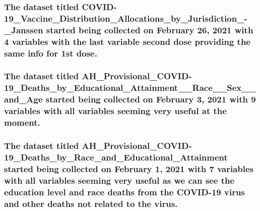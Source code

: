 \documentclass[
]{article}
\begin{document}
\hypertarget{the-dataset-titled-covid-19_vaccine_distribution_allocations_by_jurisdiction_-_janssen-started-being-collected-on-february-26-2021-with-4-variables-with-the-last-variable-second-dose-providing-the-same-info-for-1st-dose.}{%
\subsubsection{The dataset titled
COVID-19\_Vaccine\_Distribution\_Allocations\_by\_Jurisdiction\_-\_Janssen
started being collected on February 26, 2021 with 4 variables with the
last variable second dose providing the same info for 1st
dose.}\label{the-dataset-titled-covid-19_vaccine_distribution_allocations_by_jurisdiction_-_janssen-started-being-collected-on-february-26-2021-with-4-variables-with-the-last-variable-second-dose-providing-the-same-info-for-1st-dose.}}

\hypertarget{the-dataset-titled-ah_provisional_covid-19_deaths_by_educational_attainment__race__sex__and_age-started-being-collected-on-february-3-2021-with-9-variables-with-all-variables-seeming-very-useful-at-the-moment.}{%
\subsubsection{The dataset titled
AH\_Provisional\_COVID-19\_Deaths\_by\_Educational\_Attainment\_\_Race\_\_Sex\_\_and\_Age
started being collected on February 3, 2021 with 9 variables with all
variables seeming very useful at the
moment.}\label{the-dataset-titled-ah_provisional_covid-19_deaths_by_educational_attainment__race__sex__and_age-started-being-collected-on-february-3-2021-with-9-variables-with-all-variables-seeming-very-useful-at-the-moment.}}

\hypertarget{the-dataset-titled-ah_provisional_covid-19_deaths_by_race_and_educational_attainment-started-being-collected-on-february-1-2021-with-7-variables-with-all-variables-seeming-very-useful-as-we-can-see-the-education-level-and-race-deaths-from-the-covid-19-virus-and-other-deaths-not-related-to-the-virus.}{%
\subsubsection{The dataset titled
AH\_Provisional\_COVID-19\_Deaths\_by\_Race\_and\_Educational\_Attainment
started being collected on February 1, 2021 with 7 variables with all
variables seeming very useful as we can see the education level and race
deaths from the COVID-19 virus and other deaths not related to the
virus.}\label{the-dataset-titled-ah_provisional_covid-19_deaths_by_race_and_educational_attainment-started-being-collected-on-february-1-2021-with-7-variables-with-all-variables-seeming-very-useful-as-we-can-see-the-education-level-and-race-deaths-from-the-covid-19-virus-and-other-deaths-not-related-to-the-virus.}}
\end{document}
